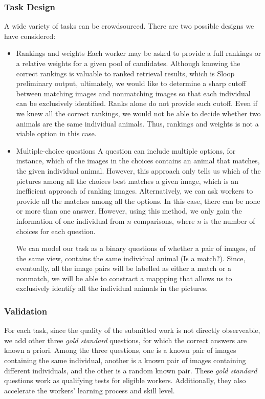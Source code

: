 \subsubsection{Task Design}

A wide variety of tasks can be crowdsourced. There are two possible designs we
have considered:
\begin{itemize}
	\item Rankings and weights
    Each worker may be asked to provide a full rankings or a relative weights
    for a given pool of candidates. Although knowing the correct rankings is
    valuable to ranked retrieval results, which is Sloop preliminary output,
    ultimately, we would like to determine a sharp cutoff between matching
    images and nonmatching images so that each individual can be exclusively
    identified. Ranks alone do not provide such cutoff. Even if we knew all the
    correct rankings, we would not be able to decide whether two animals are
    the same individual animals. Thus, rankings and weights is not a viable
    option in this case.
	\item Multiple-choice questions
    A question can include multiple options, for instance, which of the images
    in the choices contains an animal that matches, the given individual
    animal. However, this approach only tells us which of the pictures among
    all the choices best matches a given image, which is an inefficient
    approach of ranking images. Alternatively, we can ask workers to provide
    all the matches among all the options. In this case, there can be none or
    more than one answer. However, using this method, we only gain the
    information of one individual from $n$ comparisons, where $n$ is the number
    of choices for each question.

    We can model our task as a binary questions of whether a pair of images, of
    the same view, contains the same individual animal (Is a match?). Since,
    eventually, all the image pairs will be labelled as either a match or a
    nonmatch, we will be able to constract a mappping that allows us to
    exclusively identify all the individual animals in the pictures.
\end{itemize}

\subsubsection{Validation}
\label{subsub:validation}

For each task, since the quality of the submitted work is not directly
observeable, we add other three \emph{gold standard} questions, for which the
correct answers are known a priori. Among the three questions, one is a known
pair of images containing the same individual, another is a known pair of
images containing different individuals, and the other is a random known pair.
These \emph{gold standard} questions work as qualifying tests for eligible
workers. Additionally, they also accelerate the workers' learning process and
skill level.

